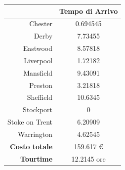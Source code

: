 
		\begin{table}[H]
			\small
			\centering
			\label{table:instance_1_arrival}
			\begin{tabular}{rc}

				\toprule
				& Tempo di Arrivo \\

				\midrule
				Chester & 0.694545 \\
				Derby & 7.73455 \\
				Eastwood & 8.57818 \\
				Liverpool & 1.72182 \\
				Mansfield & 9.43091 \\
				Preston & 3.21818 \\
				Sheffield & 10.6345 \\
				Stockport  & 0 \\
				Stoke on Trent & 6.20909 \\
				Warrington & 4.62545 \\
				\midrule
				\textbf{Costo totale} & 159.617 € \\
				\textbf{Tourtime} & 12.2145 ore \\
				\bottomrule
			\end{tabular}
		\end{table}


